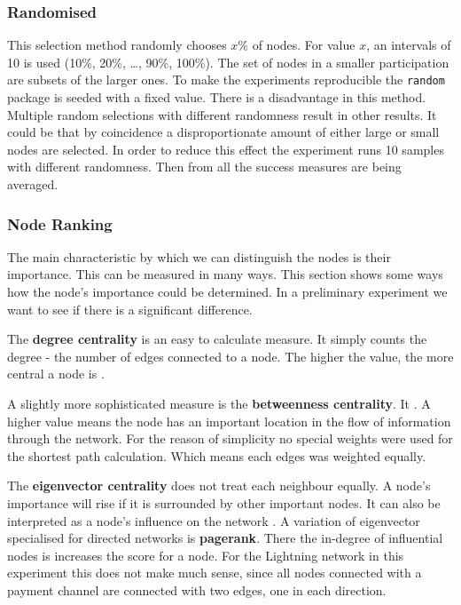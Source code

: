 \documentclass[final]{fhnwreport}       %
\begin{document}
\subsubsection{Randomised}
This selection method randomly chooses $x\%$ of nodes. For value $x$, an intervals of 10 is used (10\%, 20\%, \ldots, 90\%, 100\%). The set of nodes in a smaller participation are subsets of the larger ones. To make the experiments reproducible the \texttt{random} package is seeded with a fixed value. There is a disadvantage in this method. Multiple random selections with different randomness result in other results. It could be that by coincidence a disproportionate amount of either large or small nodes are selected. In order to reduce this effect the experiment runs 10 samples with different randomness. Then from all the success measures are being averaged. 

\subsubsection{Node Ranking}
The main characteristic by which we can distinguish the nodes is their importance. This can be measured in many ways. This section shows some ways how the node's importance could be determined. In a preliminary experiment we want to see if there is a significant difference.

The \textbf{degree centrality} is an easy to calculate measure. It simply counts the degree - the number of edges connected to a node. The higher the value, the more central a node is \citep{golbeck_analyzing_2013}.

A slightly more sophisticated measure is the \textbf{betweenness centrality}. It . A higher value means the node has an important location in the flow of information through the network. For the reason of simplicity no special weights were used for the shortest path calculation. Which means each edges was weighted equally.

The \textbf{eigenvector centrality} does not treat each neighbour equally. A node's importance will rise if it is surrounded by other important nodes. It can also be interpreted as a node's influence on the network \citep{golbeck_analyzing_2013}. A variation of eigenvector specialised for directed networks is \textbf{pagerank}. There the in-degree of influential nodes is increases the score for a node. For the Lightning network in this experiment this does not make much sense, since all nodes connected with a payment channel are connected with two edges, one in each direction.
\end{document}
